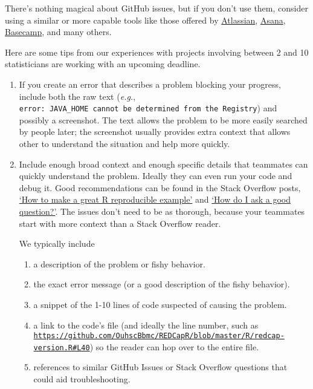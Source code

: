 \documentclass[
]{book}
\begin{document}
There's nothing magical about GitHub issues, but if you don't use them, consider using a similar or more capable tools like those offered by \href{https://www.atlassian.com/}{Atlassian}, \href{https://asana.com/}{Asana}, \href{https://basecamp.com/}{Basecamp}, and many others.

Here are some tips from our experiences with projects involving between 2 and 10 statisticians are working with an upcoming deadline.

\begin{enumerate}
\def\labelenumi{\arabic{enumi}.}
\item
  If you create an error that describes a problem blocking your progress, include both the raw text (\emph{e.g.}, \texttt{error:\ JAVA\_HOME\ cannot\ be\ determined\ from\ the\ Registry}) and possibly a screenshot. The text allows the problem to be more easily searched by people later; the screenshot usually provides extra context that allows other to understand the situation and help more quickly.
\item
  Include enough broad context and enough specific details that teammates can quickly understand the problem. Ideally they can even run your code and debug it. Good recommendations can be found in the Stack Overflow posts, \href{https://stackoverflow.com/questions/5963269/how-to-make-a-great-r-reproducible-example?rq=1}{`How to make a great R reproducible example'} and \href{https://stackoverflow.com/help/how-to-ask}{`How do I ask a good question?'}. The issues don't need to be as thorough, because your teammates start with more context than a Stack Overflow reader.

  We typically include

  \begin{enumerate}
  \def\labelenumii{\arabic{enumii}.}
  \item
    a description of the problem or fishy behavior.
  \item
    the exact error message (or a good description of the fishy behavior).
  \item
    a snippet of the 1-10 lines of code suspected of causing the problem.
  \item
    a link to the code's file (and ideally the line number, such as \href{https://github.com/OuhscBbmc/REDCapR/blob/master/R/redcap-version.R\#L40}{\texttt{https://github.com/OuhscBbmc/REDCapR/blob/master/R/redcap-version.R\#L40}}) so the reader can hop over to the entire file.
  \item
    references to similar GitHub Issues or Stack Overflow questions that could aid troubleshooting.
  \end{enumerate}
\end{enumerate}
\end{document}
